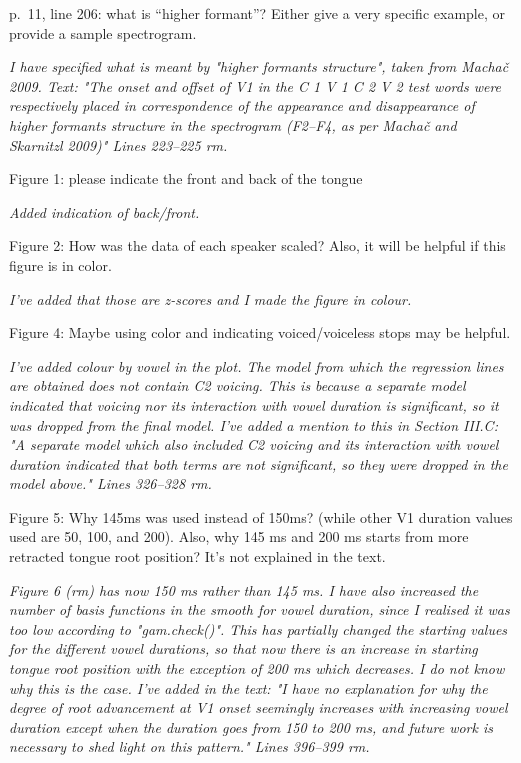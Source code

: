 \documentclass[]{article}
\begin{document}
p.~11, line 206: what is ``higher formant''? Either give a very specific
example, or provide a sample spectrogram.

\begin{adjustwidth}{1cm}{} \textit{
I have specified what is meant by "higher formants structure", taken from Machač 2009. Text: "The onset and offset of V1 in the C 1 V 1 C 2 V 2 test words were respectively placed in correspondence of the appearance and disappearance of higher formants structure in the spectrogram (F2–F4, as per Machač and Skarnitzl 2009)" Lines 223--225 rm.
} \end{adjustwidth}

Figure 1: please indicate the front and back of the tongue

\begin{adjustwidth}{1cm}{} \textit{
Added indication of back/front.
} \end{adjustwidth}

Figure 2: How was the data of each speaker scaled? Also, it will be
helpful if this figure is in color.

\begin{adjustwidth}{1cm}{} \textit{
I've added that those are z-scores and I made the figure in colour.
} \end{adjustwidth}

Figure 4: Maybe using color and indicating voiced/voiceless stops may be
helpful.

\begin{adjustwidth}{1cm}{} \textit{
I've added colour by vowel in the plot. The model from which the regression lines are obtained does not contain C2 voicing. This is because a separate model indicated that voicing nor its interaction with vowel duration is significant, so it was dropped from the final model. I've added a mention to this in Section III.C: "A separate model which also included C2 voicing and its interaction with vowel duration indicated that both terms are not significant, so they were dropped in the model above." Lines 326--328 rm.
} \end{adjustwidth}

Figure 5: Why 145ms was used instead of 150ms? (while other V1 duration
values used are 50, 100, and 200). Also, why 145 ms and 200 ms starts
from more retracted tongue root position? It's not explained in the
text.

\begin{adjustwidth}{1cm}{} \textit{
Figure 6 (rm) has now 150 ms rather than 145 ms. I have also increased the number of basis functions in the smooth for vowel duration, since I realised it was too low according to "gam.check()". This has partially changed the starting values for the different vowel durations, so that now there is an increase in starting tongue root position with the exception of 200 ms which decreases. I do not know why this is the case. I've added in the text: "I have no explanation for why the degree of root advancement at V1 onset seemingly increases with increasing vowel duration except when the duration goes from 150 to 200 ms, and future work is necessary to shed light on this pattern." Lines 396--399 rm.
} \end{adjustwidth}
\end{document}
